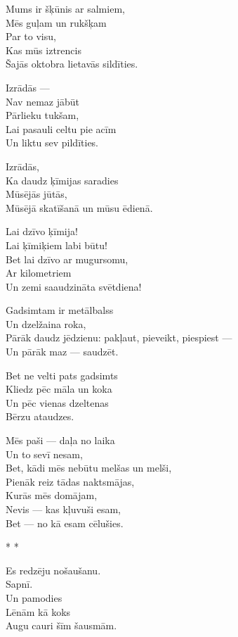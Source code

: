 \documentclass[14pt]{extarticle}
\begin{document}
Mums ir šķūnis ar salmiem,\\
Mēs guļam un rukšķam\\
Par to visu,\\
Kas mūs iztrencis\\
Šajās oktobra lietavās sildīties.

Izrādās ---\\
Nav nemaz jābūt\\
Pārlieku tukšam,\\
Lai pasauli celtu pie acīm\\
Un liktu sev pildīties.

Izrādās,\\
Ka daudz ķīmijas saradies\\
Mūsējās jūtās,\\
Mūsējā skatīšanā un mūsu ēdienā.

Lai dzīvo ķīmija!\\
Lai ķīmiķiem labi būtu!\\
Bet lai dzīvo ar mugursomu,\\
Ar kilometriem\\
Un zemi saaudzināta svētdiena!

Gadsimtam ir metālbalss\\
Un dzelžaina roka,\\
Pārāk daudz jēdzienu: pakļaut, pieveikt, piespiest ---\\
Un pārāk maz --- saudzēt.

Bet ne velti pats gadsimts\\
Kliedz pēc māla un koka\\
Un pēc vienas dzeltenas\\
Bērzu ataudzes.

Mēs paši --- daļa no laika\\
Un to sevī nesam,\\
Bet, kādi mēs nebūtu melšas un melši,\\
Pienāk reiz tādas naktsmājas,\\
Kurās mēs domājam,\\
Nevis --- kas kļuvuši esam,\\
Bet --- no kā esam cēlušies.


\newpage

{\large \sc * * *}

Es redzēju nošaušanu.\\
Sapnī.\\
Un pamodies\\
Lēnām kā koks\\
Augu cauri šīm šausmām.
\end{document}
